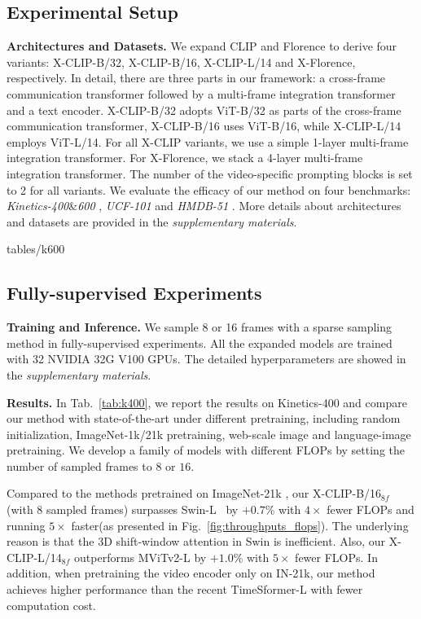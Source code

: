 \documentclass[runningheads]{llncs}
\begin{document}
\subsection{Experimental Setup}\label{sec:datasets}

\textbf{Architectures and Datasets.} We expand CLIP and Florence to derive four variants: X-CLIP-B/32, X-CLIP-B/16, X-CLIP-L/14 and X-Florence, respectively. In detail, there are three parts in our framework: a cross-frame communication transformer followed by a multi-frame integration transformer and a text encoder. X-CLIP-B/32 adopts ViT-B/32 as parts of the cross-frame communication transformer, X-CLIP-B/16 uses ViT-B/16, while X-CLIP-L/14 employs ViT-L/14. For all X-CLIP variants, we use a simple 1-layer multi-frame integration transformer. For X-Florence, we stack a 4-layer multi-frame integration transformer. The number of the video-specific prompting blocks is set to 2 for all variants. We evaluate the efficacy of our method on four benchmarks: \textit{Kinetics-400$\&$600} \cite{k400,k600}, \textit{UCF-101} \cite{soomro2012ucf101} and \textit{HMDB-51} \cite{kuehne2011hmdb}. More details about architectures and datasets are provided in the \emph{supplementary materials}.


{tables/k600}
\subsection{Fully-supervised Experiments} \label{sec:full-supervised}
\textbf{Training and Inference.} We sample 8 or 16 frames with a sparse sampling method in fully-supervised experiments. All the expanded models are trained with 32 NVIDIA 32G V100 GPUs. The detailed hyperparameters are showed in the \emph{supplementary materials}.

\textbf{Results.} In Tab.~\ref{tab:k400}, we report the results on Kinetics-400 and compare our method with state-of-the-art under different pretraining, including random initialization, ImageNet-1k/21k \cite{deng2009imagenet} pretraining, web-scale image and language-image pretraining. We develop a family of models with different FLOPs by setting the number of sampled frames to $8$ or $16$. 

Compared to the methods pretrained on ImageNet-21k \cite{deng2009imagenet}, our X-CLIP-B/16$_{8f}$ (with 8 sampled frames) surpasses Swin-L~\cite{liu2021swin} by $+0.7\%$ with $4\times$ fewer FLOPs and running $5\times$ faster(as presented in Fig.~\ref{fig:throughputs_flops}). The underlying reason is that the 3D shift-window attention in Swin is inefficient. Also, our X-CLIP-L/14$_{8f}$ outperforms MViTv2-L \cite{li2021mvitv2} by $+1.0\%$ with $5\times$ fewer FLOPs. In addition, when pretraining the video encoder only on IN-21k, our method achieves higher performance than the recent TimeSformer-L \cite{timesformer2021} with fewer computation cost.
\end{document}
